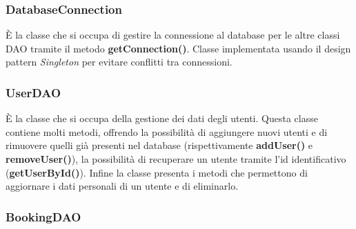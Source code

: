 \documentclass[10pt]{article}
\begin{document}
\subsubsection{DatabaseConnection}

\`E la classe che si occupa di gestire la connessione al database per le altre classi DAO tramite il metodo \textbf{getConnection()}. Classe implementata usando il design pattern \textit{Singleton} per evitare conflitti tra connessioni.

\subsubsection{UserDAO}

\`E la classe che si occupa della gestione dei dati degli utenti. Questa classe contiene molti metodi, offrendo la possibilit\`a di aggiungere nuovi utenti e di rimuovere quelli gi\`a presenti nel database (rispettivamente \textbf{addUser()} e \textbf{removeUser()}), la possibilit\`a di recuperare un utente tramite l'id identificativo (\textbf{getUserById()}). Infine la classe presenta i metodi che permettono di aggiornare i dati personali di un utente e di eliminarlo.

\subsubsection{BookingDAO}
\end{document}
